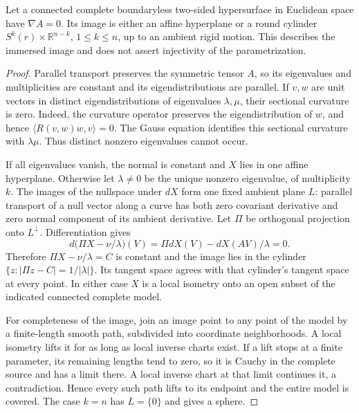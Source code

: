 \begin{lemma}\label{lem:complete-parallel-hypersurface}
Let a connected complete boundaryless two-sided hypersurface in Euclidean space have $\nabla A=0$. Its image is either an affine hyperplane or a round cylinder $S^k(r)\times\mathbb R^{n-k}$, $1\leq k\leq n$, up to an ambient rigid motion. This describes the immersed image and does not assert injectivity of the parametrization.
\end{lemma}
\begin{proof}
Parallel transport preserves the symmetric tensor $A$, so its eigenvalues and multiplicities are constant and its eigendistributions are parallel. If $v,w$ are unit vectors in distinct eigendistributions of eigenvalues $\lambda,\mu$, their sectional curvature is zero. Indeed, the curvature operator preserves the eigendistribution of $w$, and hence $\langle R(v,w)w,v\rangle=0$. The Gauss equation identifies this sectional curvature with $\lambda\mu$. Thus distinct nonzero eigenvalues cannot occur.

If all eigenvalues vanish, the normal is constant and $X$ lies in one affine hyperplane. Otherwise let $\lambda\ne0$ be the unique nonzero eigenvalue, of multiplicity $k$. The images of the nullspace under $dX$ form one fixed ambient plane $L$: parallel transport of a null vector along a curve has both zero covariant derivative and zero normal component of its ambient derivative. Let $\Pi$ be orthogonal projection onto $L^\perp$. Differentiation gives
\[
 d\bigl(\Pi X-\nu/\lambda\bigr)(V)=\Pi dX(V)-dX(AV)/\lambda=0.
\]
Therefore $\Pi X-\nu/\lambda=C$ is constant and the image lies in the cylinder $\{z:|\Pi z-C|=1/|\lambda|\}$. Its tangent space agrees with that cylinder's tangent space at every point. In either case $X$ is a local isometry onto an open subset of the indicated connected complete model.

For completeness of the image, join an image point to any point of the model by a finite-length smooth path, subdivided into coordinate neighborhoods. A local isometry lifts it for as long as local inverse charts exist. If a lift stops at a finite parameter, its remaining lengths tend to zero, so it is Cauchy in the complete source and has a limit there. A local inverse chart at that limit continues it, a contradiction. Hence every such path lifts to its endpoint and the entire model is covered. The case $k=n$ has $L=\{0\}$ and gives a sphere.
\end{proof}

